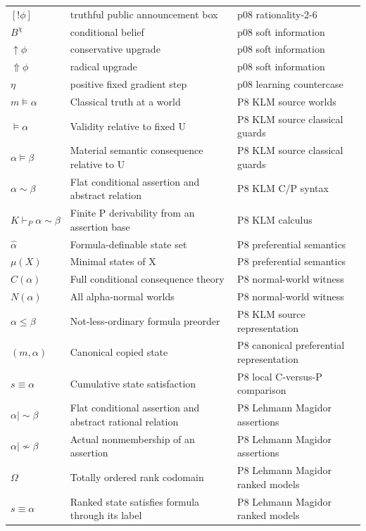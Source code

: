 \begin{longtable}{@{}p{}p{}p{}@{}}
\([!\phi]\) & truthful public announcement box & p08 rationality-\allowbreak{}2-\allowbreak{}6 \\
\(B^\chi\) & conditional belief & p08 soft information \\
\(\uparrow\phi\) & conservative upgrade & p08 soft information \\
\(\Uparrow\phi\) & radical upgrade & p08 soft information \\
\(\eta\) & positive fixed gradient step & p08 learning countercase \\
\(m\models\alpha\) & Classical truth at a world & P8 KLM source worlds \\
\(\models\alpha\) & Validity relative to fixed U & P8 KLM source classical guards \\
\(\alpha\models\beta\) & Material semantic consequence relative to U & P8 KLM source classical guards \\
\(\alpha\sim\beta\) & Flat conditional assertion and abstract relation & P8 KLM C/\allowbreak{}P syntax \\
\(K\vdash_P\alpha\sim\beta\) & Finite P derivability from an assertion base & P8 KLM calculus \\
\(\widehat\alpha\) & Formula-definable state set & P8 preferential semantics \\
\(\mu(X)\) & Minimal states of X & P8 preferential semantics \\
\(C(\alpha)\) & Full conditional consequence theory & P8 normal-\allowbreak{}world witness \\
\(N(\alpha)\) & All alpha-normal worlds & P8 normal-\allowbreak{}world witness \\
\(\alpha\leq\beta\) & Not-less-ordinary formula preorder & P8 KLM source representation \\
\((m,\allowbreak \alpha)\) & Canonical copied state & P8 canonical preferential representation \\
\(s\equiv\alpha\) & Cumulative state satisfaction & P8 local C-\allowbreak{}versus-\allowbreak{}P comparison \\
\(\alpha\mathrel{|\!\sim}\beta\) & Flat conditional assertion and abstract rational relation & P8 Lehmann Magidor assertions \\
\(\alpha\mathrel{|\!\not\sim}\beta\) & Actual nonmembership of an assertion & P8 Lehmann Magidor assertions \\
\(\Omega\) & Totally ordered rank codomain & P8 Lehmann Magidor ranked models \\
\(s\equiv\alpha\) & Ranked state satisfies formula through its label & P8 Lehmann Magidor ranked models \\

\end{longtable}
